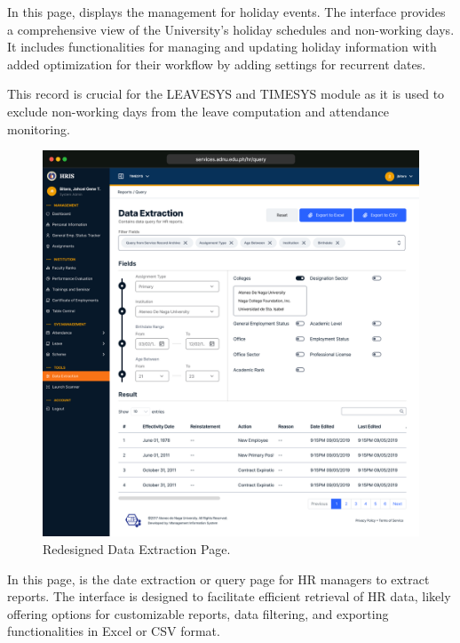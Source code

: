     In this page, displays the management for holiday events. The interface provides a comprehensive view of the University's holiday schedules and non-working days. It includes functionalities for managing and updating holiday information with added optimization for their workflow by adding settings for recurrent dates.

    This record is crucial for the LEAVESYS and TIMESYS module as it is used to exclude non-working days from the leave computation and attendance monitoring.

    \begin{figure}[H]
        \centering
        \includegraphics[width=1\linewidth]{figures/app/data-extraction.png}
        \caption{Redesigned Data Extraction Page.}
        \label{fig:app-data-extraction}
    \end{figure}

    In this page, is the date extraction or query page for HR managers to extract reports. The interface is designed to facilitate efficient retrieval of HR data, likely offering options for customizable reports, data filtering, and exporting functionalities in Excel or CSV format.

